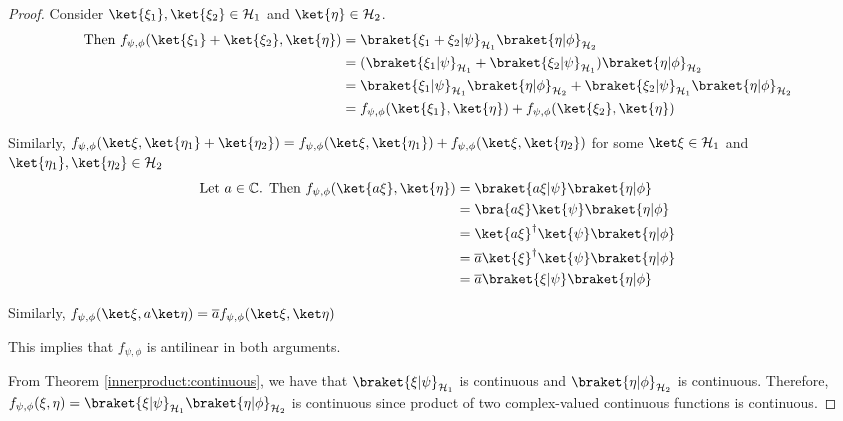 \begin{proof}

    Consider $\ket{\xi_1}, \ket{\xi_2} \in \mathcal{H}_1$ and $\ket{\eta} \in \mathcal{H}_2$. 
    \begin{align*}
        \text{Then }f_{\psi,\phi}(\ket{\xi_1} + \ket{\xi_2}, \ket{\eta}) & = \braket{\xi_1 + \xi_2 | \psi}_{\mathcal{H}_1} \braket{\eta | \phi}_{\mathcal{H}_2} 
        \\ & = (\braket{\xi_1 | \psi}_{\mathcal{H}_1}+ \braket{\xi_2 | \psi}_{\mathcal{H}_1}) \braket{\eta|\phi}_{\mathcal{H}_2}
        \\ & = \braket{\xi_1| \psi}_{\mathcal{H}_1}\braket{\eta|\phi}_{\mathcal{H}_2} + \braket{\xi_2|\psi}_{\mathcal{H}_1}\braket{\eta|\phi}_{\mathcal{H}_2}
        \\ & = f_{\psi,\phi}(\ket{\xi_1}, \ket{\eta}) + f_{\psi,\phi}(\ket{\xi_2},\ket{\eta})
    \end{align*}

    Similarly, $f_{\psi,\phi}(\ket\xi, \ket{\eta_1} + \ket{\eta_2}) = f_{\psi,\phi}(\ket\xi, \ket{\eta_1}) + f_{\psi,\phi}(\ket\xi , \ket{\eta_2})$ 
    for some $\ket\xi \in \mathcal{H}_1$ and $\ket{\eta_1}, \ket{\eta_2}  \in \mathcal{H}_2$
    \begin{align*}
    \text{Let } a \in \mathbb{C}\text{. Then }f_{\psi,\phi}(\ket{a \xi},\ket{\eta}) & = \braket{a \xi|\psi}\braket{\eta|\phi} 
        \\ & = \bra{a \xi}\ket{\psi}\braket{\eta|\phi}
        \\ & = \ket{a \xi}^\dagger \ket{\psi} \braket{\eta|\phi}
        \\ & = \overline{a} \ket{\xi}^\dagger \ket{\psi} \braket{\eta|\phi}
        \\ & = \overline{a} \braket{\xi|\psi} \braket{\eta|\phi}
    \end{align*}

    Similarly, $f_{\psi,\phi}(\ket\xi, a \ket\eta) = \overline{a}f_{\psi,\phi}(\ket\xi, \ket\eta)$

    This implies that $f_{\psi,\phi}$ is antilinear in both arguments.

    \vspace{0.5cm}
    From Theorem \ref{innerproduct:continuous}, we have that $\braket{\xi|\psi}_{\mathcal{H}_1}$ is continuous and $\braket{\eta|\phi}_{\mathcal{H}_2}$ is continuous. Therefore, $f_{\psi,\phi}(\xi, \eta) =  \braket{\xi|\psi}_{\mathcal{H}_1} \braket{\eta | \phi}_{\mathcal{H}_2}$ is continuous since product of two complex-valued continuous functions is continuous.
\end{proof}

